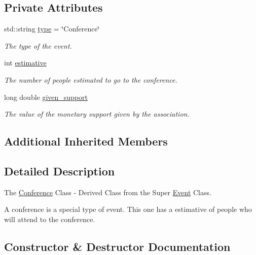 \subsection*{Private Attributes}
\begin{DoxyCompactItemize}
\item 
std\+::string \hyperlink{classConference_af456d5097dc28808360f0d0fba2160c6}{type} = \char`\"{}Conference\char`\"{}
\begin{DoxyCompactList}\small\item\em The type of the event. \end{DoxyCompactList}\item 
int \hyperlink{classConference_ab3acc9b9aec3a4dbcfd18d1611337ecb}{estimative}
\begin{DoxyCompactList}\small\item\em The number of people estimated to go to the conference. \end{DoxyCompactList}\item 
long double \hyperlink{classConference_a800a31bff9c492bc417cf8cecf450195}{given\+\_\+support}
\begin{DoxyCompactList}\small\item\em The value of the monetary support given by the association. \end{DoxyCompactList}\end{DoxyCompactItemize}
\subsection*{Additional Inherited Members}


\subsection{Detailed Description}
The \hyperlink{classConference}{Conference} Class -\/ Derived Class from the Super \hyperlink{classEvent}{Event} Class. 

A conference is a special type of event. This one has a estimative of people who will attend to the conference. 

\subsection{Constructor \& Destructor Documentation}
\mbox{\label{classConference_a433a85d640693398c2c96a2a655fc6f4}} 
